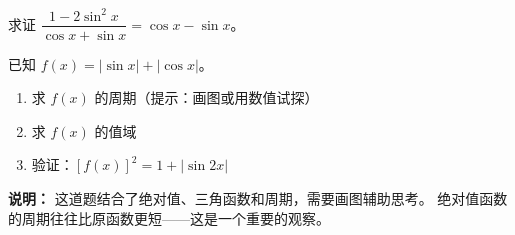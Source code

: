 \begin{exercise}[6]
求证 \(\dfrac{1 - 2\sin^2 x}{\cos x + \sin x} = \cos x - \sin x\)。
\end{exercise}


\begin{exercise}[7]
已知 \(f(x) = |\sin x| + |\cos x|\)。
\begin{enumerate}
  \item[(1)] 求 \(f(x)\) 的周期（提示：画图或用数值试探）
  \item[(2)] 求 \(f(x)\) 的值域
  \item[(3)] 验证：\([f(x)]^2 = 1 + |\sin 2x|\)
\end{enumerate}

\textbf{说明：} 这道题结合了绝对值、三角函数和周期，需要画图辅助思考。
绝对值函数的周期往往比原函数更短——这是一个重要的观察。
\end{exercise}
